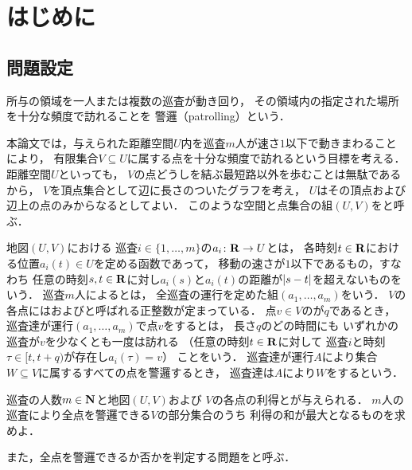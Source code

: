 \chapter{はじめに}
\label{chapter: introduction}

\section{問題設定}
\label{section: problemDefinition}
所与の領域を一人または複数の巡査が動き回り，
その領域内の指定された場所を十分な頻度で訪れることを
警邏（patrolling）という\cite{
  40021287065,
  dumitrescu2014fence,
  coene2011charlemagne,
  czyzowicz2011boundary,
  Dumitrescu:2014:CGC:2636805.2636822}．

本論文では，与えられた距離空間$U$内を巡査$m$人が速さ$1$以下で動きまわることにより，
有限集合$V \subseteq U$に属する点を十分な頻度で訪れるという目標を考える．
距離空間$U$といっても，
$V$の点どうしを結ぶ最短路以外を歩むことは無駄であるから，
$V$を頂点集合として辺に長さのついたグラフを考え，
$U$はその頂点および辺上の点のみからなるとしてよい．
このような空間と点集合の組$(U, V)$をと呼ぶ．

地図$(U, V)$における
巡査$i \in \{1, \ldots, m\}$の$a _i \colon \mathbf R \to U$とは，
各時刻$t \in \mathbf R$における位置$a _i (t) \in U$を定める函数であって，
移動の速さが$1$以下であるもの，すなわち
任意の時刻$s, t \in \mathbf R$に対し$a _i (s)$と$a _i (t)$の距離が$\lvert{s - t}\rvert$を超えないものをいう．
巡査$m$人によるとは，
全巡査の運行を定めた組$(a _1, \dots, a _m)$をいう．
$V$の各点にはおよびと呼ばれる正整数が定まっている．
点$v \in V$の{\maxIdletime}が$q$であるとき，
巡査達が運行$(a _1, \dots, a _m)$で点$v$をするとは，
長さ$q$のどの時間にも
いずれかの巡査が$v$を少なくとも一度は訪れる
（任意の時刻$t \in \mathbf R$に対して
巡査$i$と時刻$\tau \in [t, t + q)$が存在し$a _i (\tau) = v$）
ことをいう．
巡査達が運行$A$により集合$W \subseteq V$に属するすべての点を警邏するとき，
巡査達は$A$により$W$をするという．

\begin{patrollingProblem}
  巡査の人数$m \in \mathbf N$と地図$(U, V)$および
  $V$の各点の利得と{\maxIdletime}が与えられる．
  $m$人の巡査により全点を警邏できる$V$の部分集合のうち
  利得の和が最大となるものを求めよ．
\end{patrollingProblem}

また，全点を警邏できるか否かを判定する問題をと呼ぶ．

